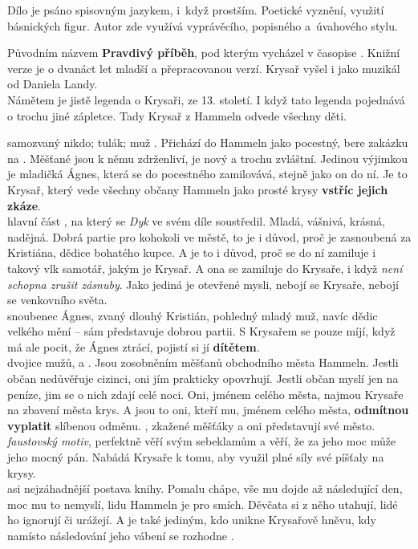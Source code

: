 \documentclass{extarticle} %
\begin{document}

\noindent Dílo je psáno spisovným jazykem, i~když prostším.
Poetické vyznění, využití básnických figur.
Autor zde využívá vyprávěcího, popisného a~úvahového stylu.

\noindent Původním názvem \textbf{Pravdivý příběh}, pod kterým vycházel v časopise .
Knižní verze je o dvanáct let mladší a přepracovanou verzí.
Krysař vyšel i jako muzikál od Daniela Landy. \\
Námětem je jistě legenda o Krysaři, ze 13. století.
I když tato legenda pojednává o trochu jiné zápletce.
Tady Krysař z Hammeln odvede všechny děti.

\noindent 
{} samozvaný nikdo; tulák; muž .
Přichází do Hammeln jako pocestný, bere zakázku na .
Měšťané jsou k němu zdrženliví, je nový a trochu zvláštní.
Jedinou výjimkou je mladičká Ágnes, která se do pocestného zamilovává, stejně jako on do ní.
Je to Krysař, který vede všechny občany Hammeln jako prosté krysy \textbf{vstříc jejich zkáze}.\\
 hlavní část , na který se \textit{Dyk} ve svém díle soustředil.
Mladá, vášnivá, krásná, nadějná.
Dobrá partie pro kohokoli ve městě, to je i důvod, proč je zasnoubená za Kristiána, dědice bohatého kupce.
A je to i důvod, proč se do ní zamiluje i takový vlk samotář, jakým je Krysař.
A ona se zamiluje do Krysaře, i když \textit{není schopna zrušit zásnuby}.
Jako jediná je otevřené mysli, nebojí se Krysaře, nebojí se venkovního světa.\\
 snoubenec Ágnes, zvaný dlouhý Kristián, pohledný mladý muž, navíc dědic velkého mění -- sám představuje dobrou partii.
S Krysařem se pouze míjí, když má ale pocit, že Ágnes ztrácí, pojistí si jí \textbf{dítětem}.\\
 dvojice mužů,  a .
Jsou zosobněním měšťanů obchodního města Hammeln.
Jestli občan nedůvěřuje cizinci, oni jím prakticky opovrhují.
Jestli občan myslí jen na peníze, jim se o nich zdají  celé noci.
Oni, jménem celého města, najmou Krysaře na zbavení města krys.
A jsou to oni, kteří mu, jménem celého města, \textbf{odmítnou vyplatit} slíbenou odměnu.
, zkažené měšťáky a oni představují své město.\\
 \textit{faustovský motiv}, perfektně věří svým sebeklamům a věří, že za jeho moc může jeho mocný pán.
Nabádá Krysaře k tomu, aby využil plné síly své píšťaly na krysy.\\
 asi nejzáhadnější postava knihy.
Pomalu chápe, vše mu dojde až následující den, moc mu to nemyslí, lidu Hammeln je pro smích.
Děvčata si z něho utahují, lidé ho ignorují či urážejí.
A je také jediným, kdo unikne Krysařově hněvu, kdy namísto následování jeho vábení se rozhodne .
\end{document}
